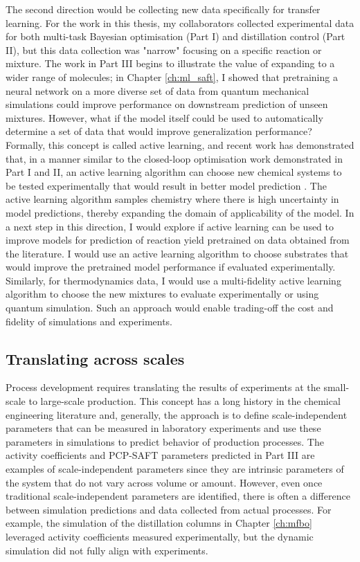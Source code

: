The second direction would be collecting new data specifically for transfer learning. For the work in this thesis, my collaborators collected experimental data for both multi-task Bayesian optimisation (Part I) and distillation control (Part II), but this data collection was "narrow" focusing on a specific reaction or mixture. The work in Part III begins to illustrate the value of expanding to a wider range of molecules; in Chapter \ref{ch:ml_saft}, I showed that pretraining a neural network on a more diverse set of data from quantum mechanical simulations could improve performance on downstream prediction of unseen mixtures. However, what if the model itself could be used to automatically determine a set of data that would  improve generalization performance? Formally, this concept is called active learning, and recent work has demonstrated that, in a manner similar to the closed-loop optimisation work demonstrated in Part I and II, an active learning algorithm can choose new chemical systems to be tested experimentally that would result in better model prediction \cite{Angello2022}. The active learning algorithm samples chemistry where there is high uncertainty in model predictions, thereby expanding the domain of applicability of the model.  In a next step in this direction, I would explore if active learning can be used to improve models for prediction of reaction yield pretrained on data obtained from the literature. I would use an active learning algorithm to choose substrates that would improve the pretrained model performance if evaluated experimentally. Similarly, for thermodynamics data, I would use a multi-fidelity active learning algorithm to choose the new mixtures to evaluate experimentally or using quantum simulation. Such an approach would enable trading-off the cost and fidelity of simulations and experiments. 

\subsection{Translating across scales}

Process development requires translating the results of experiments at the small-scale to large-scale production. This concept has a long history in the chemical engineering literature and, generally, the approach is to define scale-independent parameters that can be measured in laboratory experiments and use these parameters in simulations to predict behavior of production processes. The activity coefficients and PCP-SAFT parameters predicted in Part III are examples of scale-independent parameters since they are intrinsic parameters of the system that do not vary across volume or amount. However, even once traditional  scale-independent parameters are identified, there is often a difference between simulation predictions and data collected from actual processes. For example, the simulation of the distillation columns in Chapter \ref{ch:mfbo} leveraged activity coefficients measured experimentally, but the dynamic simulation did not fully align with experiments. 

